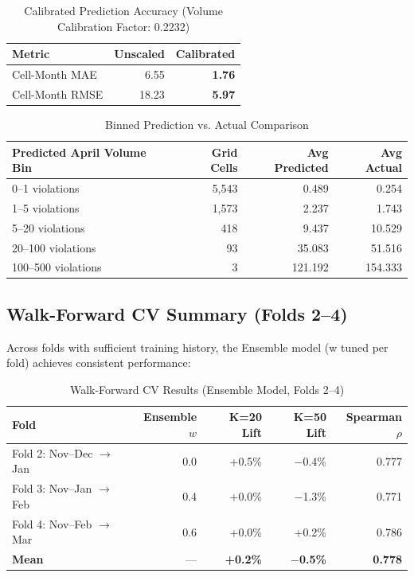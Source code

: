 \documentclass[12pt,a4paper]{article}
\begin{document}
\begin{table}[H]
\centering
\caption{Calibrated Prediction Accuracy (Volume Calibration Factor: 0.2232)}
\begin{tabular}{lrr}
\toprule
\textbf{Metric} & \textbf{Unscaled} & \textbf{Calibrated} \\
\midrule
Cell-Month MAE & 6.55 & \textbf{1.76} \\
Cell-Month RMSE & 18.23 & \textbf{5.97} \\
\bottomrule
\end{tabular}
\end{table}

\begin{table}[H]
\centering
\caption{Binned Prediction vs. Actual Comparison}
\begin{tabular}{lrrr}
\toprule
\textbf{Predicted April Volume Bin} & \textbf{Grid Cells} & \textbf{Avg Predicted} & \textbf{Avg Actual} \\
\midrule
0--1 violations & 5,543 & 0.489 & 0.254 \\
1--5 violations & 1,573 & 2.237 & 1.743 \\
5--20 violations & 418 & 9.437 & 10.529 \\
20--100 violations & 93 & 35.083 & 51.516 \\
100--500 violations & 3 & 121.192 & 154.333 \\
\bottomrule
\end{tabular}
\end{table}

\subsection{Walk-Forward CV Summary (Folds 2--4)}

Across folds with sufficient training history, the Ensemble model (w tuned per fold) achieves consistent performance:

\begin{table}[H]
\centering
\caption{Walk-Forward CV Results (Ensemble Model, Folds 2--4)}
\begin{tabular}{lrrrr}
\toprule
\textbf{Fold} & \textbf{Ensemble $w$} & \textbf{K=20 Lift} & \textbf{K=50 Lift} & \textbf{Spearman $\rho$} \\
\midrule
Fold 2: Nov--Dec $\to$ Jan & 0.0 & +0.5\% & $-$0.4\% & 0.777 \\
Fold 3: Nov--Jan $\to$ Feb & 0.4 & +0.0\% & $-$1.3\% & 0.771 \\
Fold 4: Nov--Feb $\to$ Mar & 0.6 & +0.0\% & +0.2\% & 0.786 \\
\midrule
\rowcolor{emerald!10} \textbf{Mean} & — & \textbf{+0.2\%} & \textbf{$-$0.5\%} & \textbf{0.778} \\
\bottomrule
\end{tabular}
\end{table}
\end{document}
